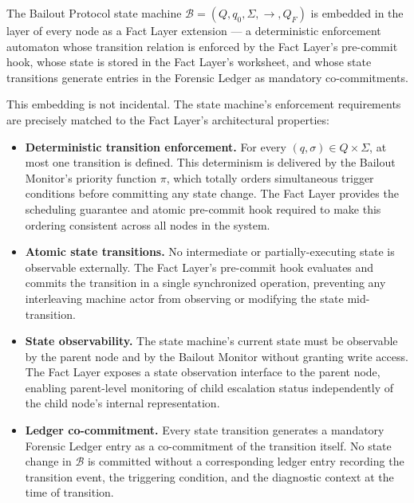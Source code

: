 The Bailout Protocol state machine $\mathcal{B} = (Q, q_0, \Sigma, \rightarrow, Q_F)$ is embedded in the \fact{} layer of every \bxthree{} node as a Fact Layer extension — a deterministic enforcement automaton whose transition relation is enforced by the Fact Layer's pre-commit hook, whose state is stored in the Fact Layer's worksheet, and whose state transitions generate entries in the Forensic Ledger as mandatory co-commitments.

This embedding is not incidental. The state machine's enforcement requirements are precisely matched to the Fact Layer's architectural properties:

\begin{itemize}\itemsep=0pt
\item[(\textit{i})] \textbf{Deterministic transition enforcement.} For every $(q, \sigma) \in Q \times \Sigma$, at most one transition is defined. This determinism is delivered by the Bailout Monitor's priority function $\pi$, which totally orders simultaneous trigger conditions before committing any state change. The Fact Layer provides the scheduling guarantee and atomic pre-commit hook required to make this ordering consistent across all nodes in the system.

\item[(\textit{ii})] \textbf{Atomic state transitions.} No intermediate or partially-executing state is observable externally. The Fact Layer's pre-commit hook evaluates and commits the transition in a single synchronized operation, preventing any interleaving machine actor from observing or modifying the state mid-transition.

\item[(\textit{iii})] \textbf{State observability.} The state machine's current state must be observable by the parent node and by the Bailout Monitor without granting write access. The Fact Layer exposes a state observation interface to the parent node, enabling parent-level monitoring of child escalation status independently of the child node's internal representation.

\item[(\textit{iv})] \textbf{Ledger co-commitment.} Every state transition generates a mandatory Forensic Ledger entry as a co-commitment of the transition itself. No state change in $\mathcal{B}$ is committed without a corresponding ledger entry recording the transition event, the triggering condition, and the diagnostic context at the time of transition.
\end{itemize}

